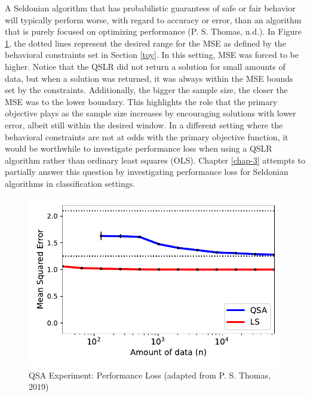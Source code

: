 \documentclass[12pt, twoside]{amherstthesis}
\begin{document}
A Seldonian algorithm that has probabilistic guarantees of safe or fair behavior will typically perform worse, with regard to accuracy or error, than an algorithm that is purely focused on optimizing performance (P. S. Thomas, n.d.). In Figure \ref{fig:fig4}, the dotted lines represent the desired range for the MSE as defined by the behavioral constraints set in Section \ref{toy}. In this setting, MSE was forced to be higher. Notice that the QSLR did not return a solution for small amounts of data, but when a solution was returned, it was always within the MSE bounds set by the constraints. Additionally, the bigger the sample size, the closer the MSE was to the lower boundary. This highlights the role that the primary objective plays as the sample size increases by encouraging solutions with lower error, albeit still within the desired window. In a different setting where the behavioral constraints are not at odds with the primary objective function, it would be worthwhile to investigate performance loss when using a QSLR algorithm rather than ordinary least squares (OLS). Chapter \ref{chap-3} attempts to partially answer this question by investigating performance loss for Seldonian algorithms in classification settings.
\begin{figure}

{\centering \includegraphics{Dasha-Asienga_StatThesis_files/figure-latex/fig4-3} 

}

\caption{QSA Experiment: Performance Loss (adapted from P. S. Thomas, 2019)}\label{fig:fig4}
\end{figure}
\end{document}
